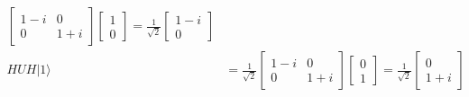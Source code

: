\begin{align*}
\begin{bmatrix}
                                                    1 - i & 0     \\
                                                    0     & 1 + i
                                                \end{bmatrix}
    \begin{bmatrix}
        1 \\
        0
    \end{bmatrix}
    = \frac{1}{\sqrt{2}}\begin{bmatrix}
                            1 - i \\
                            0
                        \end{bmatrix}                           \\
    HUH|1\rangle          & = \frac{1}{\sqrt{2}}\begin{bmatrix}
                                                    1 - i & 0     \\
                                                    0     & 1 + i
                                                \end{bmatrix}
    \begin{bmatrix}
        0 \\
        1
    \end{bmatrix}
    = \frac{1}{\sqrt{2}}\begin{bmatrix}
                            0 \\
                            1 + i
                        \end{bmatrix}
\end{align*}


